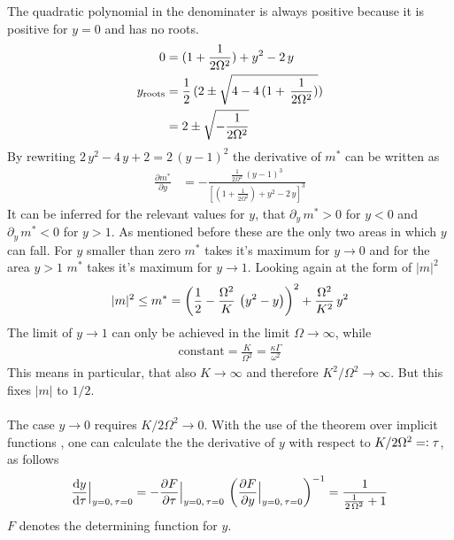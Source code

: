     The quadratic polynomial in the denominater is always positive because it is positive for $y=0$ and has no roots.
    \begin{align*}
        0&=(1+\frac{1}{2\Omega^2})+{y}^2-2\,{y}\\
        y_\text{roots}&=\frac{1}{2}\,(2\pm\sqrt{4-4\,(1+\,\frac{1}{2\Omega^2})})\\
        &=2\pm\sqrt{-\frac{1}{2\Omega^2}}
    \end{align*}
    By rewriting $2\,y^2-4\,y+2=2\,(y-1)^2$ the derivative of $m^*$ can be written as
    \begin{align*}
        \frac{\partial m^*}{\partial{y}}&=-\frac{\frac{1}{2\Omega^2}\,({y}-1)^3}{\left[(1+\frac{1}{2\Omega^2})+{y}^2-2\,{y}\right]^3}
    \end{align*}
    It can be inferred for the relevant values for $y$, that $\partial_{{y}}\,m^*>0$ for ${y}<0$ and $\partial_{{y}}\,m^*<0$ for ${y}>1$. As mentioned before these are the only two areas in which ${y}$ can fall. For $y$ smaller than zero $m^*$ takes it's maximum for ${y}\rightarrow0$ and for the area ${y}>1$ $m^*$ takes it's maximum for ${y}\rightarrow1$. Looking again at the form of $|m|^2$ 
    \begin{align*}
        |m|^2\leq m^*=\left( \frac{1}{2}-\frac{\Omega^2}{K}\,\left( {y}^2- {y} \right) \right)^2+\frac{\Omega^2}{K^2}\,{y}^2
    \end{align*}
    The limit of ${y}\rightarrow1$ can only be achieved in the limit $\Omega\rightarrow\infty$, while%
    \begin{align*}
        \text{constant}=\frac{K}{\Omega^2}=\frac{\kappa\Gamma}{\omega^2}
    \end{align*}
    This means in particular, that also $K\rightarrow\infty$ and therefore $K^2/\Omega^2\rightarrow\infty$. But this fixes $|m|$ to $1/2$. \\\\
    The case $y\rightarrow0$ requires $K/2\Omega^2\rightarrow0$. With the use of the theorem over implicit functions \cite{deitmar_analysis_2021}, one can calculate the the derivative of $y$ with respect to $K/2\Omega^2=\vcentcolon\tau$, as follows
    \begin{align*}
        \frac{\text{d} y}{\text{d}\tau}\Big|_{y=0,\,\tau=0}=-\frac{\partial F}{\partial\tau}\Big|_{y=0,\,\tau=0}\,\left(\frac{\partial F}{\partial y}\Big|_{y=0,\,\tau=0}\right)^{-1}=\frac{1}{\frac{1}{2\,\Omega^2}+1}
    \end{align*}
    $F$ denotes the determining function for $y$. 
